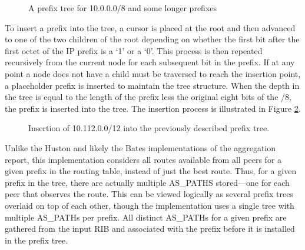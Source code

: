 \begin{figure}
    \caption{A prefix tree for 10.0.0.0/8 and some longer prefixes}
    \label{fig:ex_prefix_tree}
\end{figure}

To insert a prefix into the tree, a cursor is placed at the root and then advanced to one of the two children of the root depending on whether the first bit after the first octet of the IP prefix is a `1' or a `0'. This process is then repeated recursively from the current node for each subsequent bit in the prefix. If at any point a node does not have a child must be traversed to reach the insertion point, a placeholder prefix is inserted to maintain the tree structure. When the depth in the tree is equal to the length of the prefix less the original eight bits of the /8, the prefix is inserted into the tree. The insertion process is illustrated in Figure \ref{fig:ex_prefix_tree_insert}.

\begin{figure}
    \caption{Insertion of 10.112.0.0/12 into the previously described prefix tree.}
    \label{fig:ex_prefix_tree_insert}
\end{figure}

Unlike the Huston and likely the Bates implementations of the aggregation report, this implementation considers all routes available from all peers for a given prefix in the routing table, instead of just the best route. Thus, for a given prefix in the tree, there are actually multiple AS\_PATHS stored---one for each peer that observes the route. This can be viewed logically as several prefix trees overlaid on top of each other, though the implementation uses a single tree with multiple AS\_PATHs per prefix. All distinct AS\_PATHs for a given prefix are gathered from the input RIB and associated with the prefix before it is installed in the prefix tree.

